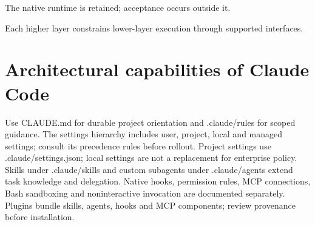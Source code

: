 \documentclass[11pt,letterpaper]{article}
\begin{document}
\begin{center}\begin{minipage}{\linewidth}\captionsetup{type=figure}\centering{}\caption{Native harness versus custom outer harness}
\small The native runtime is retained; acceptance occurs outside it.\end{minipage}\end{center}
\begin{center}\begin{minipage}{\linewidth}\captionsetup{type=figure}\centering{}\caption{Layered coding agent architecture}
\small Each higher layer constrains lower-layer execution through supported interfaces.\end{minipage}\end{center}
\section{Architectural capabilities of Claude Code}
Use CLAUDE.md for durable project orientation and .claude/rules for scoped guidance. The settings hierarchy includes user, project, local and managed settings; consult its precedence rules before rollout. Project settings use .claude/settings.json; local settings are not a replacement for enterprise policy. Skills under .claude/skills and custom subagents under .claude/agents extend task knowledge and delegation. Native hooks, permission rules, MCP connections, Bash sandboxing and noninteractive invocation are documented separately. Plugins bundle skills, agents, hooks and MCP components; review provenance before installation. \cite{cmem,csettings,cskills,cagents,chooks,cperm,csandbox,cmcp,chead,cplugin}
\end{document}
